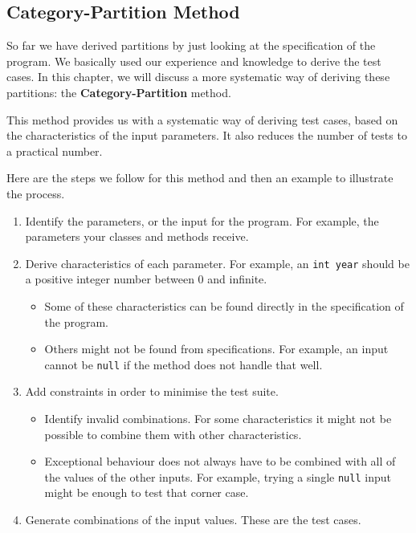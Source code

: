 \hypertarget{category-partition-method}{%
\subsection{Category-Partition Method}\label{category-partition-method}}

So far we have derived partitions by just looking at the specification
of the program. We basically used our experience and knowledge to derive
the test cases. In this chapter, we will discuss a more systematic way
of deriving these partitions: the \textbf{Category-Partition} method.

This method provides us with a systematic way of deriving test cases,
based on the characteristics of the input parameters. It also reduces
the number of tests to a practical number.

Here are the steps we follow for this method and then an example to
illustrate the process.

\begin{enumerate}
\def\labelenumi{\arabic{enumi}.}
\tightlist
\item
  Identify the parameters, or the input for the program. For example,
  the parameters your classes and methods receive.
\item
  Derive characteristics of each parameter. For example, an
  \texttt{int\ year} should be a positive integer number between 0 and
  infinite.

  \begin{itemize}
  \tightlist
  \item
    Some of these characteristics can be found directly in the
    specification of the program.
  \item
    Others might not be found from specifications. For example, an input
    cannot be \texttt{null} if the method does not handle that well.
  \end{itemize}
\item
  Add constraints in order to minimise the test suite.

  \begin{itemize}
  \tightlist
  \item
    Identify invalid combinations. For some characteristics it might not
    be possible to combine them with other characteristics.
  \item
    Exceptional behaviour does not always have to be combined with all
    of the values of the other inputs. For example, trying a single
    \texttt{null} input might be enough to test that corner case.
  \end{itemize}
\item
  Generate combinations of the input values. These are the test cases.
\end{enumerate}

